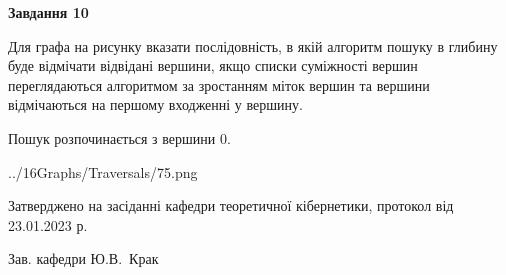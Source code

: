 \documentclass[12pt, ukrainian]{article}
\begin{document}
{\begin {large}
{\begin {center}\textbf{Завдання 10}\end {center}}\par
Для графа на рисунку вказати послідовність, в якій алгоритм пошуку в глибину буде відмічати відвідані вершини, якщо списки суміжності вершин переглядаються алгоритмом за зростанням міток вершин та вершини відмічаються на першому вход\-женні у вершину.\par
Пошук розпочинається з вершини 0.\par

\begin{center}
	{../16Graphs/Traversals/75.png}
\end{center}\par
\newpage


\end {large}
}
{\smallskip \begin {small} Затверджено на засіданні кафедри теоретичної кібернетики, протокол  від   23.01.2023 р.\par\smallskip\smallskip
{\parbox {6.5 cm}{Зав. кафедри \dotfill Ю.В.~Крак}} \end{small}}
\end{document}
